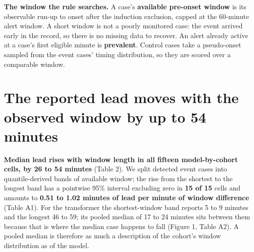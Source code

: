 \textbf{The window the rule searches.} A case's \textbf{available pre-onset window} is its observable
run-up to onset after the induction exclusion, capped at the 60-minute alert window. A short
window is not a poorly monitored case: the event arrived early in the record, so there is no
missing data to recover. An alert already active at a case's first eligible minute is
\textbf{prevalent}. Control cases take a pseudo-onset sampled from the event cases' timing
distribution, so they are scored over a comparable window.

\section{The reported lead moves with the observed window by up to 54 minutes}\label{the-reported-lead-moves-with-the-observed-window-by-up-to-54-minutes}

\textbf{Median lead rises with window length in all fifteen model-by-cohort cells, by 26 to 54
minutes} (Table 2). We split detected event cases into
quantile-derived bands of available window; the rise from the shortest to the longest band has a
pointwise 95\% interval excluding zero in \textbf{15 of 15} cells and amounts to \textbf{0.51 to 1.02 minutes of lead per minute of window
difference} (Table A1). For the transformer the shortest-window band reports 5 to 9 minutes and
the longest 46 to 59; its pooled median of 17 to 24 minutes sits between them because that is
where the median case happens to fall (Figure 1, Table A2). A pooled median is therefore as much
a description of the cohort's window distribution as of the model.

